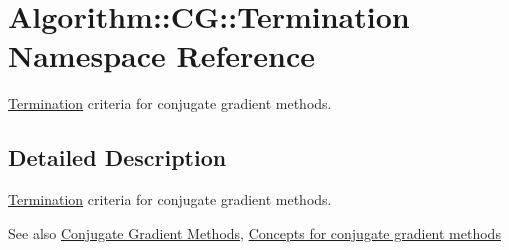 \hypertarget{namespaceAlgorithm_1_1CG_1_1Termination}{}\section{Algorithm\+:\+:C\+G\+:\+:Termination Namespace Reference}
\label{namespaceAlgorithm_1_1CG_1_1Termination}


\hyperlink{namespaceAlgorithm_1_1CG_1_1Termination}{Termination} criteria for conjugate gradient methods.  




\subsection{Detailed Description}
\hyperlink{namespaceAlgorithm_1_1CG_1_1Termination}{Termination} criteria for conjugate gradient methods. 

\begin{DoxySeeAlso}{See also}
\hyperlink{group__CGGroup}{Conjugate Gradient Methods}, \hyperlink{group__CGConceptGroup}{Concepts for conjugate gradient methods} 
\end{DoxySeeAlso}
